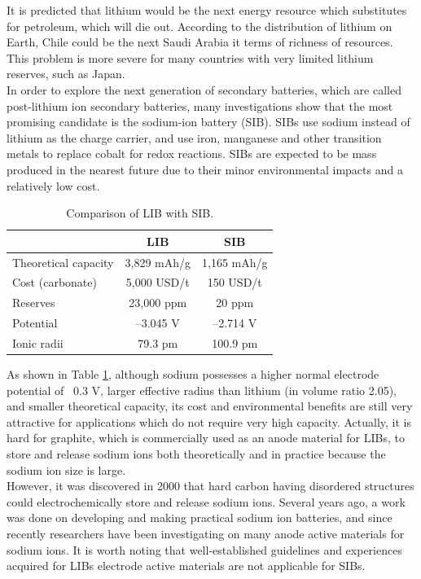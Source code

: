 It is predicted that lithium would be the next energy resource which substitutes for petroleum, which will die out. According to the distribution of lithium on Earth\cite{Jaskula2011a}, Chile could be the next Saudi Arabia it terms of richness of resources. This problem is more severe for many countries with very limited lithium reserves, such as Japan. \\
In order to explore the next generation of secondary batteries, which are called post-lithium ion secondary batteries, many investigations
show that the most promising candidate is the sodium-ion battery (SIB). SIBs use sodium instead of lithium as the charge carrier, and use iron, manganese and other transition metals to replace cobalt for redox reactions. SIBs are expected to be mass produced in the nearest future due to their minor environmental impacts and a relatively low cost.

\begin{table}[ht]
\centering %
\begin{tabular}{|l|c|c|} %
\hline %
 & LIB & SIB\\ [0.5ex] %
\hline %
Theoretical capacity & 3,829 mAh/g & 1,165 mAh/g \\[1.5ex] %
Cost (carbonate) & 5,000 USD/t & 150 USD/t \\[1.5ex]%
Reserves & 23,000 ppm & 20 ppm \\[1.5ex]
Potential & –3.045 V & –2.714 V \\[1.5ex]
Ionic radii & 79.3 pm & 100.9 pm \\[1.5ex]
\hline %
\end{tabular}
\caption{Comparison of LIB with SIB.} %
\label{table1.1} %
\end{table}

As shown in Table \ref{table1.1}, although sodium possesses a higher normal electrode potential of ~0.3 V, larger effective radius than lithium (in volume ratio 2.05), and smaller theoretical capacity, its cost and environmental benefits are still very attractive for applications which do not require very high capacity. Actually, it is hard for graphite, which is commercially used as an anode material for LIBs, to store and release sodium ions both theoretically and in practice because the sodium ion size is large. \\
However, it was discovered in 2000 that hard carbon having disordered structures could electrochemically store and release sodium ions.\cite{Stevens2000} Several years ago, a work was done on developing and making practical sodium ion batteries, and since recently researchers have been investigating on many anode active materials for sodium ions. It is worth noting that well-established guidelines and experiences acquired for LIBs electrode active materials are not applicable for SIBs.\cite{Lang2010,Armand2008,KUZE2013}

